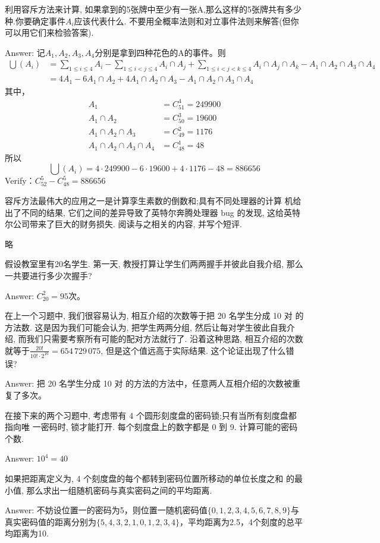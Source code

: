\exer 利用容斥方法来计算, 如果拿到的5张牌中至少有一张A,那么这样的5张牌共有多少种.你要确定事件$A_i$应该代表什么. 不要用全概率法则和对立事件法则来解答(但你可以用它们来检验答案).\par
Answer: 记$A_1,A_2,A_3,A_4$分别是拿到四种花色的A的事件。则
\begin{align*}
\bigcup(A_i)&=\sum_{1\le i\le 4}A_i-\sum_{1\le i<j\le 4}A_i\cap A_j+ \sum_{1\le i<j<k\le 4}A_i\cap A_j\cap A_k - A_1\cap A_2\cap A_3\cap A_4 \\
&=4A_1-6A_1\cap A_2 + 4 A_1\cap A_2\cap A_3 - A_1\cap A_2\cap A_3 \cap A_4
\end{align*}
其中，
\begin{align*}
A_1&= C_{51}^4 = 249900 \\
A_1\cap A_2&= C_{50}^3 = 19600 \\
A_1\cap A_2\cap A_3&= C_{49}^2 = 1176 \\
A_1\cap A_2\cap A_3\cap A_4&= C_{48}^1 = 48 
\end{align*}
所以
\[\bigcup(A_i) = 4\cdot 249900 -6\cdot 19600+4\cdot1176-48=886656 \]
Verify：$C_{52}^5-C_{48}^5=886656$

\exer 容斥方法最伟大的应用之一是计算孪生素数的倒数和;具有不同处理器的计算
机给出了不同的结果, 它们之间的差异导致了英特尔奔腾处理器 bug 的发现, 这给英特尔公司带来了巨大的财务损失. 阅读与之相关的内容, 并写个短评.
\par
略

\exer 假设教室里有20名学生. 第一天, 教授打算让学生们两两握手并彼此自我介绍, 那么一共要进行多少次握手?\par
Answer: $C_{20}^2=95$次。

\exer 在上一个习题中, 我们很容易认为, 相互介绍的次数等于把 20 名学生分成 10 对 的方法数. 这是因为我们可能会认为, 把学生两两分组, 然后让每对学生彼此自我介绍, 而我们只需要考察所有可能的配对方法就行了. 沿着这种思路, 相互介绍的次数就等于$\frac{20!}{10!\cdot2^{10}} = 654\,729\,075$, 但是这个值远高于实际结果. 这个论证出现了什么错误?\par
Answer: 把 20 名学生分成 10 对 的方法的方法中，任意两人互相介绍的次数被重复了多次。

在接下来的两个习题中, 考虑带有 4 个圆形刻度盘的密码锁;只有当所有刻度盘都指向唯 一密码时, 锁才能打开. 每个刻度盘上的数字都是 0 到 9.
\exer 计算可能的密码个数.\par
Answer: $10^4=40$

\exer 如果把距离定义为, 4 个刻度盘的每个都转到密码位置所移动的单位长度之和 的最小值, 那么求出一组随机密码与真实密码之间的平均距离.\par
Answer: 不妨设位置一的密码为5，则位置一随机密码值$\{0,1,2,3,4,5,6,7,8,9\}$与真实密码值的距离分别为$\{5,4,3,2,1,0,1,2,3,4\}$，平均距离为2.5，4个刻度的总平均距离为10.